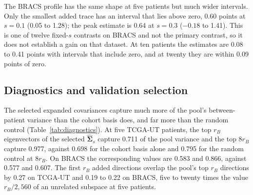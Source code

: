 \noindent The BRACS profile has the same shape at five patients but much wider intervals. Only the smallest added trace has an interval that lies above zero, 0.60 points at $s=0.1$ (0.05 to 1.28); the peak estimate is 0.64 at $s=0.3$ ($-0.18$ to 1.41). This is one of twelve fixed-$s$ contrasts on BRACS and not the primary contrast, so it does not establish a gain on that dataset. At ten patients the estimates are 0.08 to 0.41 points with intervals that include zero, and at twenty they are within 0.09 points of zero.

\subsection{Diagnostics and validation selection}
\label{sec:diagnostics-results}
The selected expanded covariances capture much more of the pool's between-patient variance than the cohort basis does, and far more than the random control (Table~\ref{tab:diagnostics}). At five TCGA-UT patients, the top $r_B$ eigenvectors of the selected $\hat{\boldsymbol\Sigma}_s$ capture 0.711 of the pool variance and the top $8r_B$ capture 0.977, against 0.698 for the cohort basis alone and 0.795 for the random control at $8r_B$. On BRACS the corresponding values are 0.583 and 0.866, against 0.577 and 0.607. The first $r_B$ added directions overlap the pool's top $r_B$ directions by 0.27 on TCGA-UT and 0.19 to 0.22 on BRACS, five to twenty times the value $r_B/2{,}560$ of an unrelated subspace at five patients.

